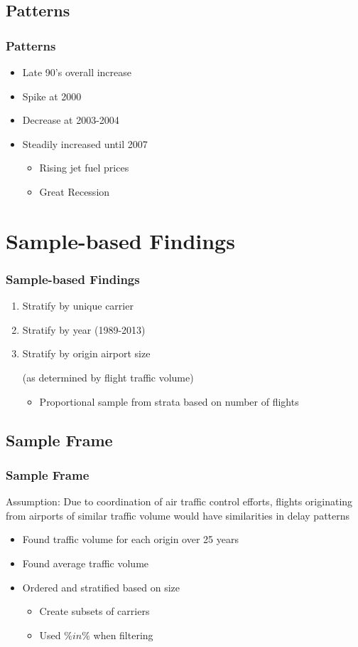 \documentclass{beamer}
\begin{document}
\subsection{Patterns}
\begin{frame}
\frametitle{Patterns}
\begin{itemize}
\item Late 90's overall increase
\item Spike at 2000
\item Decrease at 2003-2004
\item Steadily increased until 2007 
\begin{itemize}
\item Rising jet fuel prices 
\item Great Recession 
\end{itemize}
\end{itemize}

\end{frame}

\section{Sample-based Findings}
\begin{frame}
\frametitle{Sample-based Findings}
\begin{enumerate}
\item Stratify by unique carrier
\item Stratify by year (1989-2013)
\item Stratify by origin airport size 

(as determined by flight traffic volume)
\begin{itemize}
\item Proportional sample from strata based on number of flights 
\end{itemize}
\end{enumerate}

\end{frame}

\subsection{Sample Frame}
\begin{frame}
\frametitle{Sample Frame}
Assumption: Due to coordination of air traffic control efforts, flights originating from airports of similar traffic volume would have similarities in delay patterns
\begin{itemize}
\item Found traffic volume for each origin over 25 years 
\item Found average traffic volume 
\item Ordered and stratified based on size
\begin{itemize}
\item Create subsets of carriers 
\item Used $\%in\%$ when filtering
\end{itemize}
\end{itemize}
\end{frame}
\end{document}
